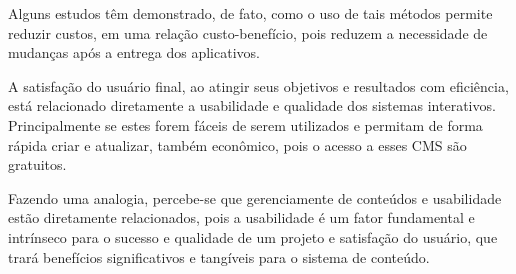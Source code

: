 Alguns estudos têm demonstrado, de fato, como o uso de tais métodos permite reduzir custos, em uma relação custo-benefício, pois reduzem a necessidade de mudanças após a entrega dos aplicativos.

A satisfação do usuário final, ao atingir seus objetivos e resultados com eficiência, está relacionado diretamente a usabilidade e qualidade dos sistemas interativos. Principalmente se estes forem fáceis de serem utilizados e permitam de forma rápida criar e atualizar, também econômico, pois o acesso a esses CMS são gratuitos.

Fazendo uma analogia, percebe-se  que gerenciamente de conteúdos e usabilidade estão diretamente relacionados, pois a usabilidade é um fator fundamental e intrínseco para o sucesso e qualidade de um projeto e satisfação do usuário, que trará benefícios significativos e tangíveis para o sistema de conteúdo.



